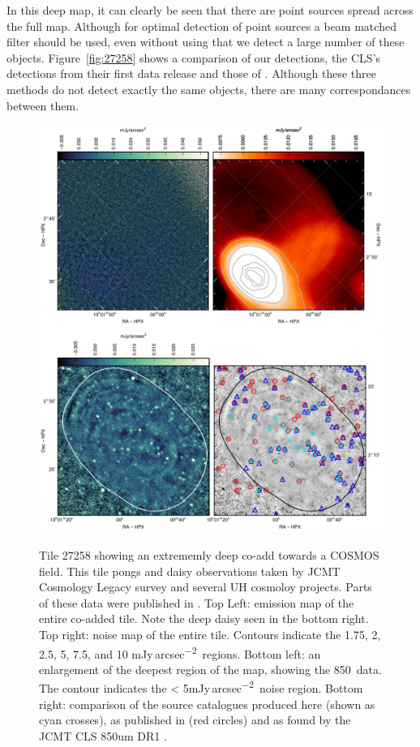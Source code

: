 \documentclass[twocolumn,times]{aastex6}
\newcommand{\jyas}{Jy\,arcsec\textsuperscript{$-$2}}
\begin{document}
In this deep map, it can clearly be seen that there are point sources
spread across the full map. Although for optimal detection of point
sources a beam matched filter should be used, even without using that
we detect a large number of these objects. Figure~\ref{fig:27258}
shows a comparison of our detections, the CLS's detections from their
first data release \citep{Geach2016} and those of
\citet{Casey2013}. Although these three methods do not detect exactly the
same objects, there are many correspondances between them.

\begin{figure}
  \includegraphics{27258-whole-map.pdf}
  \\[3mm]
  \includegraphics{27258-zoomin.pdf}
  \caption{Tile 27258 showing an extrememly deep co-add towards a
    COSMOS field. This tile pongs and daisy observations taken by JCMT
    Cosmology Legacy survey and several UH cosmoloy projects. Parts of
    these data were published in
    \citet{Casey2013,Chen2013,Chen2013a,Geach2016}. Top Left: emission
    map of the entire co-added tile. Note the deep daisy seen in the
    bottom right. Top right: noise map of the entire tile. Contours
    indicate the 1.75, 2, 2.5, 5, 7.5, and 10 m\jyas\ regions. Bottom
    left: an enlargement of the deepest region of the map, showing the
    850\micron\ data. The contour indicates the < 5m\jyas\ noise
    region. Bottom right: comparison of the source catalogues produced
    here (shown as cyan crosses), as published in \citealt{Casey2013}
    (red circles) and as found by the JCMT CLS 850um DR1 \citep[blue
    triangles]{Geach2016}. }
  \label{fig:t27258}
\end{figure}
\end{document}
